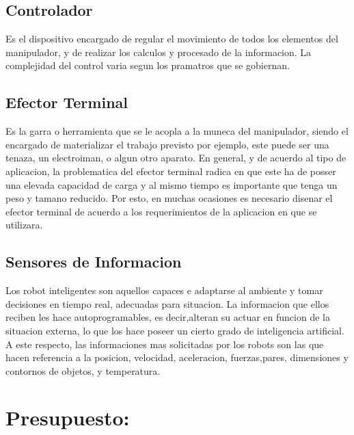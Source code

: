 \documentclass[14pt,a4paper]{article}
\begin{document}
\subsection{Controlador}
Es el dispositivo encargado de regular el movimiento de todos los elementos del manipulador, y de realizar los calculos y procesado de la informacion. La complejidad del control varia segun los pramatros que se gobiernan.
\subsection{Efector Terminal}
Es la garra o herramienta que se le acopla a la muneca del manipulador, siendo el encargado de materializar el trabajo previsto por ejemplo, este puede ser una tenaza, un electroiman, o algun otro aparato. En general, y de acuerdo al tipo de aplicacion, la problematica del efector terminal radica en que este ha de posser una elevada capacidad de carga y al mismo tiempo es importante que tenga un peso y tamano reducido. Por esto, en muchas ocasiones es necesario disenar el efector terminal de acuerdo a los requerimientos de la aplicacion en que se utilizara.
\subsection{Sensores de Informacion}
Los robot inteligentes son aquellos capaces e adaptarse al ambiente y tomar decisiones en tiempo real, adecuadas para situacion. La informacion que ellos reciben les hace autoprogramables, es decir,alteran su actuar en funcion de la situacion externa, lo que los hace poseer un cierto grado de inteligencia artificial. A este respecto, las informaciones mas solicitadas por los robots son las que hacen referencia a la posicion, velocidad, aceleracion, fuerzas,pares, dimensiones y contornos de objetos, y temperatura.

\section{Presupuesto:}
\end{document}
